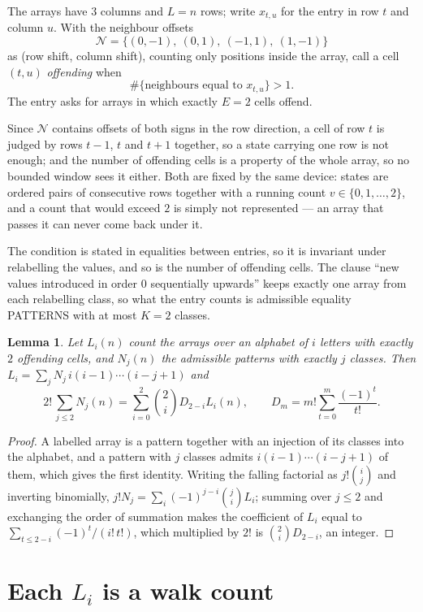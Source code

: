 \documentclass[11pt,a4paper]{article}
\theoremstyle{plain}
\newtheorem{lemma}[theorem]{Lemma}
\theoremstyle{definition}
\begin{document}
The arrays have $3$ columns and $L=n$ rows; write $x_{t,u}$ for the entry in
row $t$ and column $u$. With the neighbour offsets
\[
\mathcal N=\{(0,-1),\ (0,1),\ (-1,1),\ (1,-1)\}
\]
as (row shift, column shift), counting only positions inside the array, call a cell
$(t,u)$ \emph{offending} when
\[
\#\{\text{neighbours equal to }x_{t,u}\}>1 .
\]
The entry asks for arrays in which exactly $E=2$ cells offend.

Since $\mathcal N$ contains offsets of both signs in the row direction, a cell of row
$t$ is judged by rows $t-1$, $t$ and $t+1$ together, so a state carrying one row is not
enough; and the number of offending cells is a property of the whole array, so no bounded
window sees it either. Both are fixed by the same device: states are ordered pairs of
consecutive rows together with a running count $v\in\{0,1,\dots,2\}$, and a count that
would exceed $2$ is simply not represented --- an array that passes it can never come back
under it.

The condition is stated in equalities between entries, so it is invariant under relabelling
the values, and so is the number of offending cells. The clause ``new values introduced in
order $0$ sequentially upwards'' keeps exactly one array from each relabelling class, so what
the entry counts is admissible equality PATTERNS with at most $K=2$ classes.

\begin{lemma}\label{lem:inv}
Let $L_i(n)$ count the arrays over an alphabet of $i$ letters with exactly $2$ offending
cells, and $N_j(n)$ the admissible patterns with exactly $j$ classes. Then
$L_i=\sum_j N_j\,i(i-1)\cdots(i-j+1)$ and
\[
2!\,\sum_{j\le2}N_j(n)=\sum_{i=0}^{2}\binom{2}{i}D_{2-i}L_i(n),
\qquad D_m=m!\sum_{t=0}^{m}\frac{(-1)^t}{t!} .
\]
\end{lemma}

\begin{proof}
A labelled array is a pattern together with an injection of its classes into the alphabet,
and a pattern with $j$ classes admits $i(i-1)\cdots(i-j+1)$ of them, which gives the first
identity. Writing the falling factorial as $j!\binom{i}{j}$ and inverting binomially,
$j!N_j=\sum_i(-1)^{j-i}\binom{j}{i}L_i$; summing over $j\le2$ and exchanging the
order of summation makes the coefficient of $L_i$ equal to
$\sum_{t\le2-i}(-1)^t/(i!\,t!)$, which multiplied by $2!$ is
$\binom{2}{i}D_{2-i}$, an integer.
\end{proof}

\section{Each $L_i$ is a walk count}
\end{document}

